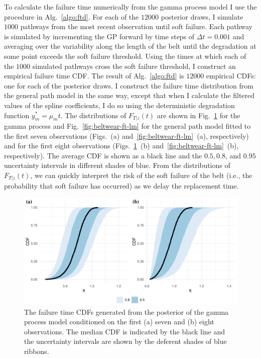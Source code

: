 To calculate the failure time numerically from the gamma process model I use the procedure in Alg.~\ref{algo:ftd}. For each of the $12000$ posterior draws, I simulate $1000$ pathways from the most recent observation until soft failure. Each pathway is simulated by incrementing the GP forward by time steps of $\Delta t = 0.001$ and averaging over the variability along the length of the belt until the degradation at some point exceeds the soft failure threshold. Using the times at which each of the $1000$ simulated pathways cross the soft failure threshold, I construct an empirical failure time CDF. The result of Alg.~\ref{algo:ftd} is $12000$ empirical CDFs: one for each of the posterior draws. I construct the failure time distribution from the general path model in the same way, except that when I calculate the filtered values of the spline coefficients, I do so using the deterministic degradation function $y^*_m = \mu_m t$. The distributions of $F_{T|z}(t)$ are shown in Fig.~\ref{fig:beltwear-ft-gp} for the gamma process and Fig.~\ref{fig:beltwear-ft-lm} for the general path model fitted to the first seven observations (Figs.~(a) and~\ref{fig:beltwear-ft-lm}~(a), respectively) and for the first eight observations (Figs.~\ref{fig:beltwear-ft-gp}~(b) and~\ref{fig:beltwear-ft-lm}~(b), respectively). The average CDF is shown as a black line and the $0.5, 0.8$, and $0.95$ uncertainty intervals in different shades of blue. From the distributions of $F_{T|z}(t)$, we can quickly interpret the risk of the soft failure of the belt (i.e., the probability that soft failure has occurred) as we delay the replacement time.

\begin{figure}
  \centering
  \includegraphics[width=\textwidth]{figures/ch-6/belt_wear_failuretime_CDF_gp.pdf}
  \caption{The failure time CDFs generated from the posterior of the gamma process model conditioned on the first (a) seven and (b) eight observations. The median CDF is indicated by the black line and the uncertainty intervals are shown by the deferent shades of blue ribbons.}
  \label{fig:beltwear-ft-gp}
\end{figure}

